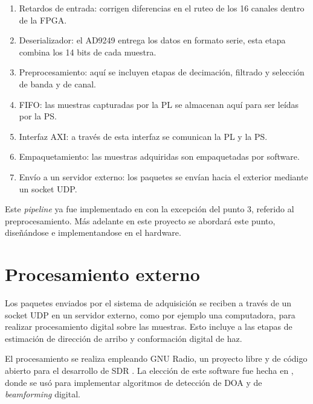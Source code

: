 \documentclass[../../main.tex]{subfiles}
\begin{document}
\begin{enumerate}
    \item Retardos de entrada: corrigen diferencias en el ruteo de los 16 canales dentro de la FPGA.
    \item Deserializador: el AD9249 entrega los datos en formato serie, esta etapa combina los 14 bits de cada muestra.
    \item Preprocesamiento: aquí se incluyen etapas de decimación, filtrado y selección de banda y de canal. 
    \item FIFO: las muestras capturadas por la PL se almacenan aquí para ser leídas por la PS.
    \item Interfaz AXI: a través de esta interfaz se comunican la PL y la PS.
    \item Empaquetamiento: las muestras adquiridas son empaquetadas por software.
    \item Envío a un servidor externo: los paquetes se envían hacia el exterior mediante un socket UDP.
\end{enumerate}

Este \textit{pipeline} ya fue implementado en \cite{proyecto-jose} con la excepción del punto 3, referido al preprocesamiento. Más adelante en este proyecto se abordará este punto, diseñándose e implementandose en el hardware.


\section{Procesamiento externo}
Los paquetes enviados por el sistema de adquisición se reciben a través de un socket UDP en un servidor externo, como por ejemplo una computadora, para realizar procesamiento digital sobre las muestras. Esto incluye a las etapas de estimación de dirección de arribo y conformación digital de haz.

El procesamiento se realiza empleando GNU Radio, un proyecto libre y de código abierto para el desarrollo de SDR \cite{GNURadio}. La elección de este software fue hecha en \cite{proyecto-grigo}, donde se usó para implementar algoritmos de detección de DOA y de \textit{beamforming} digital.
\end{document}

